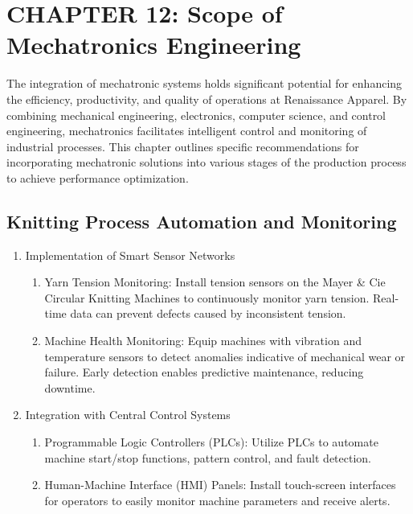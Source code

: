 \section{CHAPTER 12: Scope of Mechatronics Engineering}
The integration of mechatronic systems holds significant potential for enhancing the efficiency, productivity, and quality of operations at Renaissance Apparel. By combining mechanical engineering, electronics, computer science, and control engineering, mechatronics facilitates intelligent control and monitoring of industrial processes. This chapter outlines specific recommendations for incorporating mechatronic solutions into various stages of the production process to achieve performance optimization.

\subsection{Knitting Process Automation and Monitoring}
\begin{enumerate}
    \item Implementation of Smart Sensor Networks
    \begin{enumerate}
        \item Yarn Tension Monitoring: Install tension sensors on the Mayer \& Cie Circular Knitting Machines to continuously monitor yarn tension. Real-time data can prevent defects caused by inconsistent tension.
        \item Machine Health Monitoring: Equip machines with vibration and temperature sensors to detect anomalies indicative of mechanical wear or failure. Early detection enables predictive maintenance, reducing downtime.
    \end{enumerate}
    \item Integration with Central Control Systems
    \begin{enumerate}
        \item Programmable Logic Controllers (PLCs): Utilize PLCs to automate machine start/stop functions, pattern control, and fault detection.
        \item Human-Machine Interface (HMI) Panels: Install touch-screen interfaces for operators to easily monitor machine parameters and receive alerts.
    \end{enumerate}
\end{enumerate}

